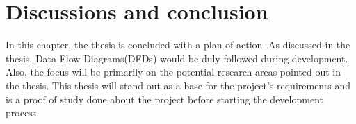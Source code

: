 \chapter{Discussions and conclusion}
In this chapter, the thesis is concluded with a plan of action. As discussed in the thesis, Data Flow Diagrams(DFDs) would be duly followed during development. Also, the focus will be primarily on the potential research areas pointed out in the thesis. This thesis will stand out as a base for the project's requirements and is a proof of study done about the project before starting the development process.
